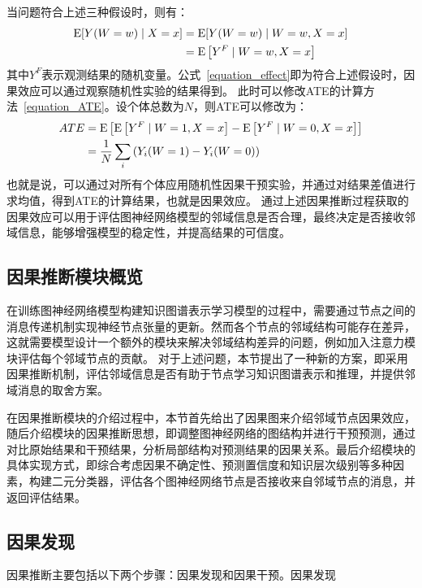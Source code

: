 \documentclass[algorithmlist, AutoFakeBold, AutoFakeSlant, figurelist, tablelist, nomlist, masters]{seuthesix}
\begin{document}
当问题符合上述三种假设时，则有：
\begin{equation}
  \begin{aligned}
  {\rm E}[Y(W=w) \mid X=x] & ={\rm E}[Y(W=w) \mid W=w, X=x] \\
  & ={\rm E}\left[Y^F \mid W=w, X=x\right]
  \end{aligned}
  \label{equation_effect}
\end{equation}
其中$Y^F$表示观测结果的随机变量。公式~\ref{equation_effect}即为符合上述假设时，因果效应可以通过观察随机性实验的结果得到。
此时可以修改ATE的计算方法~\ref{equation_ATE}。设个体总数为$N$，则ATE可以修改为：
\begin{equation}
  \begin{aligned}
  ATE & ={\rm E}\left[{\rm E}\left[Y^F \mid W=1, X=x\right]-{\rm E}\left[Y^F \mid W=0, X=x\right]\right] \\
  & =\frac{1}{N} \sum_i\left(Y_i(W=1)-Y_i(W=0)\right)
  \end{aligned}
  \label{equation_newATE}
\end{equation}
也就是说，可以通过对所有个体应用随机性因果干预实验，并通过对结果差值进行求均值，得到ATE的计算结果，也就是因果效应。
通过上述因果推断过程获取的因果效应可以用于评估图神经网络模型的邻域信息是否合理，最终决定是否接收邻域信息，能够增强模型的稳定性，并提高结果的可信度。

\subsection{因果推断模块概览}
在训练图神经网络模型构建知识图谱表示学习模型的过程中，需要通过节点之间的消息传递机制实现神经节点张量的更新。然而各个节点的邻域结构可能存在差异，这就需要模型设计一个额外的模块来解决邻域结构差异的问题，例如加入注意力模块评估每个邻域节点的贡献。
对于上述问题，本节提出了一种新的方案，即采用因果推断机制，评估邻域信息是否有助于节点学习知识图谱表示和推理，并提供邻域消息的取舍方案。

在因果推断模块的介绍过程中，本节首先给出了因果图来介绍邻域节点因果效应，随后介绍模块的因果推断思想，即调整图神经网络的图结构并进行干预预测，通过对比原始结果和干预结果，分析局部结构对预测结果的因果关系。最后介绍模块的具体实现方式，即综合考虑因果不确定性、预测置信度和知识层次级别等多种因素，构建二元分类器，评估各个图神经网络节点是否接收来自邻域节点的消息，并返回评估结果。

\subsection{因果发现}
因果推断主要包括以下两个步骤：因果发现和因果干预。因果发现
\end{document}
